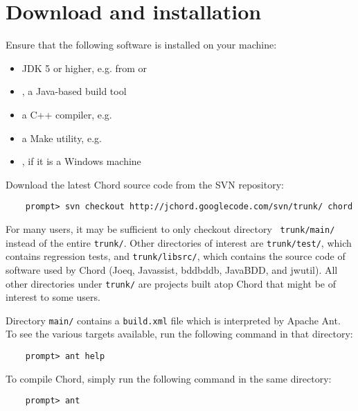 \section{Download and installation}
\label{sec:download-and-installation}

Ensure that the following software is installed on your machine:

\begin{itemize}
\item
JDK 5 or higher, e.g. from
 or
\item
{}, a Java-based build tool
\item
a C++ compiler, e.g. 
\item
a Make utility, e.g. 
\item
{}, if it is a Windows machine
\end{itemize}

Download the latest Chord source code from the SVN repository:

\begin{verbatim}
    prompt> svn checkout http://jchord.googlecode.com/svn/trunk/ chord
\end{verbatim}
For many users, it may be sufficient to only checkout directory {\tt
  trunk/main/} instead of the entire {\tt trunk/}.  Other directories
of interest are {\tt trunk/test/}, which contains regression tests,
and {\tt trunk/libsrc/}, which contains the source code of software
used by Chord (Joeq, Javassist, bddbddb, JavaBDD, and jwutil).  All
other directories under {\tt trunk/} are projects built atop Chord
that might be of interest to some users.

Directory {\tt main/} contains a {\tt build.xml} file which is
interpreted by Apache Ant.  To see the various targets available, run
the following command in that directory:

\begin{verbatim}
    prompt> ant help
\end{verbatim}

\noindent To compile Chord, simply run the following command in the same
directory:

\begin{verbatim}
    prompt> ant 
\end{verbatim}

